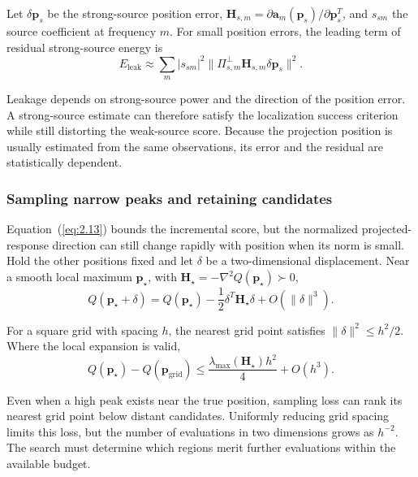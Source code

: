\documentclass[11pt,a4paper]{article}
\numberwithin{equation}{section}
\numberwithin{figure}{section}
\numberwithin{table}{section}
\begin{document}
Let $\delta\mathbf{p}_s$ be the strong-source position error, $\mathbf{H}_{s,m}=\partial\mathbf{a}_m(\mathbf{p}_s)/\partial\mathbf{p}_s^T$, and $s_{sm}$ the source coefficient at frequency $m$. For small position errors, the leading term of residual strong-source energy is
\begin{equation}\label{eq:2.16}
E_{\mathrm{leak}} \approx \sum_m |s_{sm}|^2 \|\Pi_{s,m}^\perp\mathbf{H}_{s,m}\delta\mathbf{p}_s\|^2.
\end{equation}

Leakage depends on strong-source power and the direction of the position error. A strong-source estimate can therefore satisfy the localization success criterion while still distorting the weak-source score. Because the projection position is usually estimated from the same observations, its error and the residual are statistically dependent.

\subsubsection{Sampling narrow peaks and retaining candidates}\label{sec:2.5.3}

Equation~(\ref{eq:2.13}) bounds the incremental score, but the normalized projected-response direction can still change rapidly with position when its norm is small. Hold the other positions fixed and let $\delta$ be a two-dimensional displacement. Near a smooth local maximum $\mathbf{p}_\star$, with $\mathbf{H}_\star=-\nabla^2Q(\mathbf{p}_\star)\succ0$,
\begin{equation}\label{eq:2.17}
Q(\mathbf{p}_\star+\delta) =Q(\mathbf{p}_\star) -\frac12\delta^T\mathbf{H}_\star\delta +O(\|\delta\|^3).
\end{equation}

For a square grid with spacing $h$, the nearest grid point satisfies $\|\delta\|^2\leq h^2/2$. Where the local expansion is valid,
\begin{equation}\label{eq:2.18}
Q(\mathbf{p}_\star)-Q(\mathbf{p}_{\mathrm{grid}}) \leq\frac{\lambda_{\max}(\mathbf{H}_\star)h^2}{4}+O(h^3).
\end{equation}

Even when a high peak exists near the true position, sampling loss can rank its nearest grid point below distant candidates. Uniformly reducing grid spacing limits this loss, but the number of evaluations in two dimensions grows as $h^{-2}$. The search must determine which regions merit further evaluations within the available budget.
\end{document}
